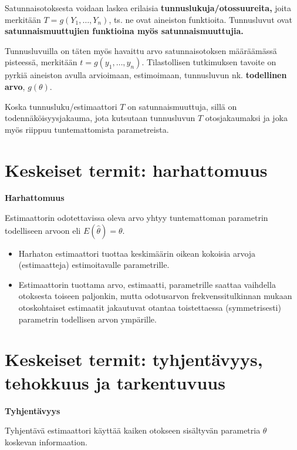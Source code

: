 \documentclass[
]{report}
\begin{document}
Satunnaisotoksesta voidaan laskea erilaisia
\textbf{tunnuslukuja/otossuureita,} joita merkitään
\(T = g(Y_1,\dots,Y_n)\), ts. ne ovat aineiston funktioita. Tunnusluvut
ovat \textbf{satunnaismuuttujien funktioina myös satunnaismuuttujia.}

Tunnusluvuilla on täten myös havaittu arvo satunnaisotoksen määräämässä
pisteessä, merkitään \(t=g(y_1,\dots,y_n)\). Tilastollisen tutkimuksen
tavoite on pyrkiä aineiston avulla arvioimaan, estimoimaan, tunnusluvun
nk. \textbf{todellinen arvo}, \(g(\theta)\).

Koska tunnusluku/estimaattori \(T\) on satunnaismuuttuja, sillä on
todennäköisyysjakauma, jota kutsutaan tunnusluvun \(T\) otosjakaumaksi
ja joka myös riippuu tuntemattomista parametreista.

\hypertarget{keskeiset-termit-harhattomuus}{%
\section{Keskeiset termit:
harhattomuus}\label{keskeiset-termit-harhattomuus}}

\begin{defblock}{}

\textbf{Harhattomuus}

Estimaattorin odotettavissa oleva arvo yhtyy tuntemattoman parametrin
todelliseen arvoon eli \(E(\widehat{\theta}) = \theta\).

\begin{itemize}
\item
  Harhaton estimaattori tuottaa keskimäärin oikean kokoisia arvoja
  (estimaatteja) estimoitavalle parametrille.
\item
  Estimaattorin tuottama arvo, estimaatti, parametrille saattaa
  vaihdella otoksesta toiseen paljonkin, mutta odotusarvon
  frekvenssitulkinnan mukaan otoskohtaiset estimaatit jakautuvat otantaa
  toistettaessa (symmetrisesti) parametrin todellisen arvon ympärille.
\end{itemize}

\end{defblock}

\hypertarget{keskeiset-termit-tyhjentuxe4vyys-tehokkuus-ja-tarkentuvuus}{%
\section{Keskeiset termit: tyhjentävyys, tehokkuus ja
tarkentuvuus}\label{keskeiset-termit-tyhjentuxe4vyys-tehokkuus-ja-tarkentuvuus}}

\begin{defblock}{}
\textbf{Tyhjentävyys}

Tyhjentävä estimaattori käyttää kaiken otokseen sisältyvän parametria
\(\theta\) koskevan informaation.

\end{defblock}
\end{document}
